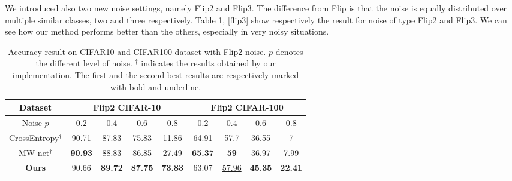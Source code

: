 \documentclass[runningheads]{llncs}
\begin{document}
	We introduced also two new noise settings, namely Flip2 and Flip3. The difference from Flip is that the noise is equally distributed over multiple similar classes, two and three respectively. Table \ref{flip2}, \ref{flip3} show respectively the result for noise of type Flip2 and Flip3. We can see how our method performs better than the others, especially in very noisy situations.
	
	\begin{table}[!ht]
		\caption{\label{flip2} Accuracy result on CIFAR10 and CIFAR100 dataset with Flip2 noise. $p$ denotes the different level of noise. $^\dagger$ indicates the results obtained by our implementation. The first and the second best results are respectively marked with bold and underline.}
		\centering
		\begin{tabular}{c|c|c|c|c||c|c|c|c}
			\hline
			Dataset  & \multicolumn{4}{c||}{Flip2 CIFAR-10} & \multicolumn{4}{c}{Flip2 CIFAR-100} \\ \hline
			Noise $p$    & 0.2        & 0.4       & 0.6       & 0.8       & 0.2        & 0.4        & 0.6       & 0.8        \\ \hline
			CrossEntropy$^\dagger$  & \underline{90.71}      & 87.83      & 75.83 & 11.86     & \underline{64.91}      & 57.7       & 36.55     & 7 \\
			MW-net$^\dagger$ \cite{shu2019meta}   & \textbf{90.93}      & \underline{88.83}      & \underline{86.85} & \underline{27.49}     & \textbf{65.37}      & \textbf{59}         & \underline{36.97}    & \underline{7.99}  \\ \hline
			\textbf{Ours}     & 90.66      & \textbf{89.72}      & \textbf{87.75}    & \textbf{73.83}  & 63.07      & \underline{57.96}      & \textbf{45.35}     & \textbf{22.41} \\ \hline
		\end{tabular}
	\end{table}
	
\end{document}
